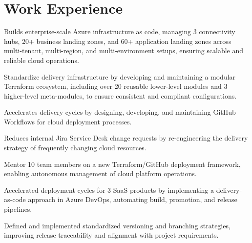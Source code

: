 \documentclass[11pt]{deedy-resume-openfont}
\begin{document}
\section{Work Experience}
\sectionsepsmall
{}\hfill {}
\begin{tightemize}
	\item Builds enterprise-scale Azure infrastructure as code, managing 3 connectivity hubs, 20+ business landing zones, and 60+ application landing zones across multi-tenant, multi-region, and multi-environment setups, ensuring scalable and reliable cloud operations.
	\item Standardize delivery infrastructure by developing and maintaining a modular Terraform ecosystem, including over 20 reusable lower-level modules and 3 higher-level meta-modules, to ensure consistent and compliant configurations.
	\item Accelerates delivery cycles by designing, developing, and maintaining GitHub Workflows for cloud deployment processes.
	\item Reduces internal Jira Service Desk change requests by re-engineering the delivery strategy of frequently changing cloud resources.
	\item Mentor 10 team members on a new Terraform/GitHub deployment framework, enabling autonomous management of cloud platform operations.
\end{tightemize}
\sectionsep
{}
\sectionsep
{}\hfill {}
\begin{tightemize}
	\item Accelerated deployment cycles for 3 SaaS products by implementing a delivery-as-code approach in Azure DevOps, automating build, promotion, and release pipelines.
	\item Defined and implemented standardized versioning and branching strategies, improving release traceability and alignment with project requirements.
\end{tightemize}
\sectionsep
{}
\sectionsep
%
%
\newpage
{}\hfill {}
\end{document}
